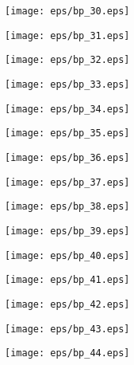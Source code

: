 \documentclass{book}
\begin{document}
	\clearpage\begin{figure}[p]
    \centering
	\texttt{[image: eps/bp\_30.eps]}
	\end{figure}
	\clearpage\begin{figure}[p]
    \centering
	\texttt{[image: eps/bp\_31.eps]}
	\end{figure}
	\clearpage\begin{figure}[p]
    \centering
	\texttt{[image: eps/bp\_32.eps]}
	\end{figure}
	\clearpage\begin{figure}[p]
    \centering
	\texttt{[image: eps/bp\_33.eps]}
	\end{figure}
	\clearpage\begin{figure}[p]
    \centering
	\texttt{[image: eps/bp\_34.eps]}
	\end{figure}
	\clearpage\begin{figure}[p]
    \centering
	\texttt{[image: eps/bp\_35.eps]}
	\end{figure}
	\clearpage\begin{figure}[p]
    \centering
	\texttt{[image: eps/bp\_36.eps]}
	\end{figure}
	\clearpage\begin{figure}[p]
    \centering
	\texttt{[image: eps/bp\_37.eps]}
	\end{figure}
	\clearpage\begin{figure}[p]
    \centering
	\texttt{[image: eps/bp\_38.eps]}
	\end{figure}
	\clearpage\begin{figure}[p]
    \centering
	\texttt{[image: eps/bp\_39.eps]}
	\end{figure}
	\clearpage\begin{figure}[p]
    \centering
	\texttt{[image: eps/bp\_40.eps]}
	\end{figure}
	\clearpage\begin{figure}[p]
    \centering
	\texttt{[image: eps/bp\_41.eps]}
	\end{figure}
	\clearpage\begin{figure}[p]
    \centering
	\texttt{[image: eps/bp\_42.eps]}
	\end{figure}
	\clearpage\begin{figure}[p]
    \centering
	\texttt{[image: eps/bp\_43.eps]}
	\end{figure}
	\clearpage\begin{figure}[p]
    \centering
	\texttt{[image: eps/bp\_44.eps]}
	\end{figure}
\end{document}
